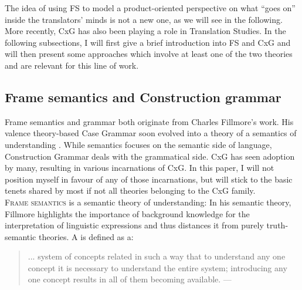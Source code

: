 \documentclass[output=paper]{LSP/langsci}
\begin{document}
The idea of using FS to model a product-oriented perspective on what ``goes on'' inside the translators' minds is not a new one, as we will see in the following. More recently, CxG has also been playing a role in Translation Studies. In the following subsections, I will first give a brief introduction into FS and CxG and will then present some approaches which involve at least one of the two theories and are relevant for this line of work. 

\subsection{Frame semantics and Construction grammar}\label{czulo:sec:2.1}

Frame semantics and  grammar both originate from Charles Fillmore's work. His valence theory-based Case Grammar \citep{Fillmore1968} soon evolved into a theory of a semantics of understanding \citep{Fillmore1985Frames}. While  semantics focuses on the semantic side of language, Construction Grammar \citep{Fillmore1985Syntactic} deals with the grammatical side. CxG has seen adoption by many, resulting in various incarnations of CxG. In this paper, I will not position myself in favour of any of those incarnations, but will stick to the basic tenets shared by most if not all theories belonging to the CxG family. \\

\noindent \textsc{Frame semantics} is a semantic theory of understanding: In his  semantic theory, Fillmore highlights the importance of background knowledge for the interpretation of linguistic expressions and thus distances it from purely truth-semantic theories. A  is defined as a:

\begin{quote}
... system of concepts related in such a way that to understand any one concept it is necessary to understand the entire system; introducing any one concept results in all of them becoming available. \hfill --- \citet{Petruck1996} 
\end{quote}
\end{document}
